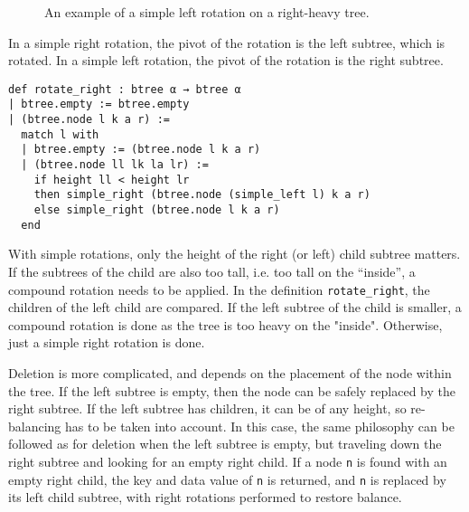 \begin{figure}[!ht]
  \begin{subfigure}{0.5\textwidth}
    \centering
  \end{subfigure}%
  \begin{subfigure}{0.5\textwidth}
    \centering
  \end{subfigure}
  \label{fig:rotation}
  \caption{An example of a simple left rotation on a right-heavy tree.}
\end{figure}

In a simple right rotation, the pivot of the rotation is the left subtree, which is rotated. In a simple left rotation, the pivot of the rotation is the right subtree.

\begin{lstlisting}
def rotate_right : btree α → btree α
| btree.empty := btree.empty
| (btree.node l k a r) :=
  match l with
  | btree.empty := (btree.node l k a r)
  | (btree.node ll lk la lr) :=
    if height ll < height lr 
    then simple_right (btree.node (simple_left l) k a r)
    else simple_right (btree.node l k a r)
  end 
\end{lstlisting}

With simple rotations, only the height of the right (or left) child subtree matters. If the subtrees of the child are also too tall, i.e. too tall on the \enquote{inside}, a compound rotation needs to be applied. In the definition \lstinline{rotate_right}, the children of the left child are compared. If the left subtree of the child is smaller, a compound rotation is done as the tree is too heavy on the "inside". Otherwise, just a simple right rotation is done.

Deletion is more complicated, and depends on the placement of the node within the tree. If the left subtree is empty, then the node can be safely replaced by the right subtree.  If the left subtree has children, it can be of any height, so re-balancing has to be taken into account. In this case, the same philosophy can be followed as for deletion when the left subtree is empty, but traveling down the right subtree and looking for an empty right child. If a node \lstinline{n} is found with an empty right child, the key and data value of \lstinline{n} is returned, and \lstinline{n} is replaced by its left child subtree, with right rotations performed to restore balance. 

